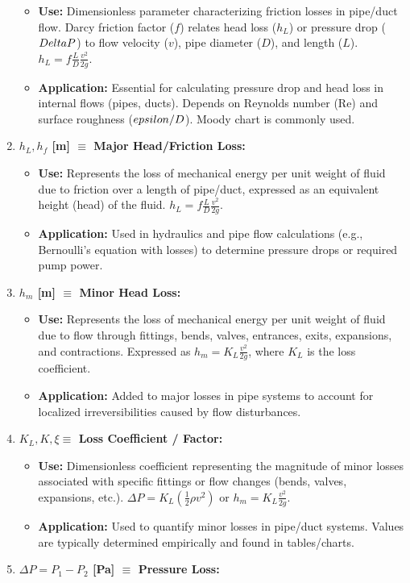 \begin{enumerate}
  \begin{itemize}
  \tightlist
  \item
    \textbf{Use:} Dimensionless parameter characterizing friction losses
    in pipe/duct flow. Darcy friction factor (\(f\)) relates head loss
    (\(h_L\)) or pressure drop (\(\\Delta P\)) to flow velocity (\(v\)),
    pipe diameter (\(D\)), and length (\(L\)).
    \(h_L = f \frac{L}{D} \frac{v^2}{2g}\).
  \item
    \textbf{Application:} Essential for calculating pressure drop and
    head loss in internal flows (pipes, ducts). Depends on Reynolds
    number (Re) and surface roughness (\(\\epsilon/D\)). Moody chart is
    commonly used.
  \end{itemize}
\item
  \textbf{\(h_L, h_f\) {[}m{]} \(\equiv\) Major Head/Friction Loss:}

  \begin{itemize}
  \tightlist
  \item
    \textbf{Use:} Represents the loss of mechanical energy per unit
    weight of fluid due to friction over a length of pipe/duct,
    expressed as an equivalent height (head) of the fluid.
    \(h_L = f \frac{L}{D} \frac{v^2}{2g}\).
  \item
    \textbf{Application:} Used in hydraulics and pipe flow calculations
    (e.g., Bernoulli's equation with losses) to determine pressure drops
    or required pump power.
  \end{itemize}
\item
  \textbf{\(h_m\) {[}m{]} \(\equiv\) Minor Head Loss:}

  \begin{itemize}
  \tightlist
  \item
    \textbf{Use:} Represents the loss of mechanical energy per unit
    weight of fluid due to flow through fittings, bends, valves,
    entrances, exits, expansions, and contractions. Expressed as
    \(h_m = K_L \frac{v^2}{2g}\), where \(K_L\) is the loss coefficient.
  \item
    \textbf{Application:} Added to major losses in pipe systems to
    account for localized irreversibilities caused by flow disturbances.
  \end{itemize}
\item
  \textbf{\(K_L, K, \xi \equiv\) Loss Coefficient / Factor:}

  \begin{itemize}
  \tightlist
  \item
    \textbf{Use:} Dimensionless coefficient representing the magnitude
    of minor losses associated with specific fittings or flow changes
    (bends, valves, expansions, etc.).
    \(\Delta P = K_L (\frac{1}{2} \rho v^2)\) or
    \(h_m = K_L \frac{v^2}{2g}\).
  \item
    \textbf{Application:} Used to quantify minor losses in pipe/duct
    systems. Values are typically determined empirically and found in
    tables/charts.
  \end{itemize}
\item
  \textbf{\(\Delta P = P_1 - P_2\) {[}Pa{]} \(\equiv\) Pressure Loss:}


\end{enumerate}
